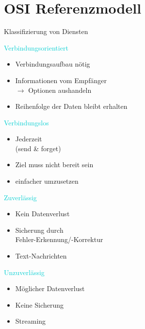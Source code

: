 \section{OSI Referenzmodell}

\begin{concept}{Klassifizierung von Diensten}
    
    \begin{minipage}{0.6\linewidth}
        \textcolor{darkturquoise}{Verbindungsorientiert}
        \begin{itemize}
            \item Verbindungsaufbau nötig
            \item Informationen vom Empfänger\\ $\rightarrow$ Optionen aushandeln
            \item Reihenfolge der Daten bleibt erhalten
        \end{itemize}
    \end{minipage}
    \begin{minipage}{0.39\linewidth}
        \textcolor{darkturquoise}{Verbindungslos}
        \begin{itemize}
            \item Jederzeit\\ (send \& forget)
            \item Ziel muss nicht bereit sein
            \item einfacher umzusetzen
        \end{itemize}
    \end{minipage}

    \vspace{0.5mm}

    \begin{minipage}{0.6\linewidth}
        \textcolor{darkturquoise}{Zuverlässig}
        \begin{itemize}
            \item Kein Datenverlust
            \item Sicherung durch\\Fehler-Erkennung/-Korrektur
            \item Text-Nachrichten
        \end{itemize}
    \end{minipage}
    \begin{minipage}{0.39\linewidth}
        \textcolor{darkturquoise}{Unzuverlässig}
        \begin{itemize}
            \item Möglicher Datenverlust
            \item Keine Sicherung
            \item Streaming
        \end{itemize}
    \end{minipage}
\end{concept}

